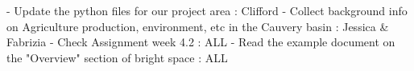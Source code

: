 - Update the python files for our project area : Clifford
- Collect background info on Agriculture production, environment, etc in the Cauvery basin : Jessica & Fabrizia
- Check Assignment week 4.2  : ALL
- Read the example document on the "Overview" section of bright space : ALL
